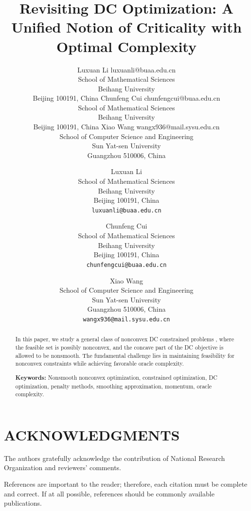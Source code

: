 \documentclass[english]{article}
\title{\LARGE \bf
Revisiting DC Optimization: A Unified Notion of Criticality with Optimal Complexity
}
\author{\name Luxuan Li \email luxuanli@buaa.edu.cn \\
       \addr School of Mathematical Sciences\\
       Beihang University\\
       Beijing 100191, China
       \AND
       \name Chunfeng Cui \email chunfengcui@buaa.edu.cn \\
       \addr School of Mathematical Sciences\\
       Beihang University\\
       Beijing 100191, China
       \AND
       \name Xiao Wang \email wangx936@mail.sysu.edu.cn \\
       \addr School of Computer Science and Engineering\\
       Sun Yat-sen University\\
       Guangzhou 510006, China}
\author{
       Luxuan Li\\
       School of Mathematical Sciences\\
       Beihang University\\
       Beijing 100191, China\\
       \texttt{luxuanli@buaa.edu.cn}
       \and
       Chunfeng Cui\\
       School of Mathematical Sciences\\
       Beihang University\\
       Beijing 100191, China\\
       \texttt{chunfengcui@buaa.edu.cn}
       \and
       Xiao Wang\\
       School of Computer Science and Engineering\\
       Sun Yat-sen University\\
       Guangzhou 510006, China\\
       \texttt{wangx936@mail.sysu.edu.cn}
       }
\newif\ifjmlrformat
\newcommand{\projectbibfile}{}
\newcommand{\projectstructuralbibfile}{}
\newcommand{\projectappendixpath}{}
\renewcommand{\projectbibfile}{tools/refers}%
\renewcommand{\projectstructuralbibfile}{tools/dca_structural_complexity_refs}%
\renewcommand{\projectappendixpath}{appendix}%
\renewcommand{\projectbibfile}{../tools/refers}%
\renewcommand{\projectstructuralbibfile}{../tools/dca_structural_complexity_refs}%
\renewcommand{\projectappendixpath}{appendix}%
\begin{document}
\maketitle


\begin{abstract}
In this paper, we study a general class of nonconvex DC constrained problems , where the feasible set is possibly nonconvex, and the concave part of the DC objective is allowed to be nonsmooth. The fundamental challenge lies in maintaining feasibility for nonconvex constraints while achieving favorable oracle complexity.

\ifjmlrformat
\begin{keywords}
Nonsmooth optimization, DC optimization, smoothing approximation, momentum, variance reduction, oracle complexity,
\end{keywords}
\else
\noindent\textbf{Keywords:} Nonsmooth nonconvex optimization,  constrained optimization, DC optimization, penalty methods, smoothing approximation, momentum, oracle complexity.
\fi


\end{abstract}











\appendix



\section{ACKNOWLEDGMENTS}

The authors gratefully acknowledge the contribution of National Research Organization and reviewers' comments.



References are important to the reader; therefore, each citation must be complete and correct. If at all possible, references should be commonly available publications.



\end{document}
